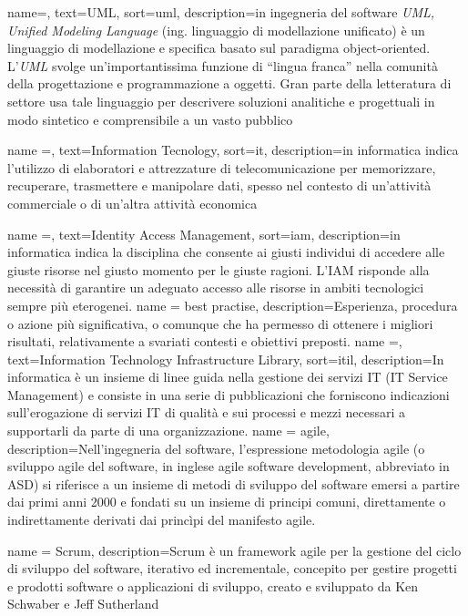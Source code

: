 {
    name=,
    text=UML,
    sort=uml,
    description={in ingegneria del software \emph{UML, Unified Modeling Language} (ing. linguaggio di modellazione unificato) è un linguaggio di modellazione e specifica basato sul paradigma object-oriented. L'\emph{UML} svolge un'importantissima funzione di ``lingua franca'' nella comunità della progettazione e programmazione a oggetti. Gran parte della letteratura di settore usa tale linguaggio per descrivere soluzioni analitiche e progettuali in modo sintetico e comprensibile a un vasto pubblico}
}

{
    name =,
    text={Information Tecnology},
    sort=it,
    description={in informatica indica l'utilizzo di elaboratori e attrezzature di telecomunicazione per memorizzare, recuperare, trasmettere e manipolare dati, spesso nel contesto di un'attività commerciale o di un'altra attività economica}
}

{
    name =,
    text={Identity Access Management},
    sort=iam,
    description={in informatica indica la disciplina che consente ai giusti individui di accedere alle giuste risorse nel giusto
    momento per le giuste ragioni. L’IAM risponde alla necessità di garantire un
    adeguato accesso alle risorse in ambiti tecnologici sempre più eterogenei.}
}
{
    name = best practise,
    description={Esperienza, procedura o azione più significativa, o comunque che ha permesso di
    ottenere i migliori risultati, relativamente a svariati contesti e obiettivi preposti.}
}
{
    name =,
    text={Information
    Technology Infrastructure Library},
    sort=itil,
    description={In informatica è un insieme di linee guida nella gestione dei servizi IT (IT Service Management) e consiste in una serie di pubblicazioni che forniscono indicazioni sull'erogazione di servizi IT di qualità e sui processi e mezzi necessari a supportarli da parte di una organizzazione.}
}
{
    name = agile,
    description={Nell'ingegneria del software, l'espressione metodologia agile (o sviluppo agile del software, in inglese agile software development, abbreviato in ASD) si riferisce a un insieme di metodi di sviluppo del software emersi a partire dai primi anni 2000 e fondati su un insieme di principi comuni, direttamente o indirettamente derivati dai princìpi del manifesto agile.}
}

{
    name = Scrum,
    description={Scrum è un framework agile per la gestione del ciclo di sviluppo del software, iterativo ed incrementale, concepito per gestire progetti e prodotti software o applicazioni di sviluppo, creato e sviluppato da Ken Schwaber e Jeff Sutherland}
}

